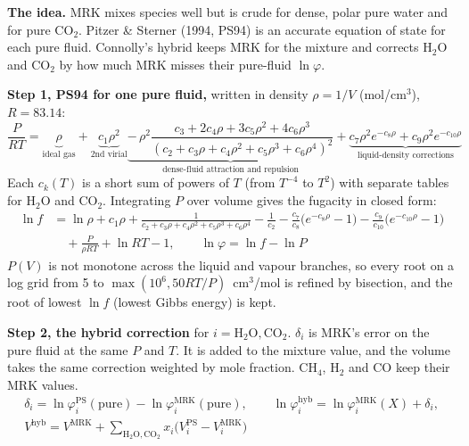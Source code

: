 \documentclass[11pt]{article}
\begin{document}
{\small\setlength{\abovedisplayskip}{2pt}\setlength{\belowdisplayskip}{2pt}
\begin{minipage}[t]{0.60\linewidth}
\textbf{The idea.} MRK mixes species well but is crude for dense, polar pure water and for pure CO$_2$. Pitzer \& Sterner (1994, PS94) is an accurate equation of state for each pure fluid. Connolly's hybrid keeps MRK for the mixture and corrects H$_2$O and CO$_2$ by how much MRK misses their pure-fluid $\ln\varphi$.

\textbf{Step 1, PS94 for one pure fluid,} written in density $\rho=1/V$ (mol/cm$^3$), $R=83.14$:
\begin{equation}
  \frac{ P}{RT}=\underbrace{\rho}_{\text{ideal gas}}+\underbrace{c_1\rho^2}_{\text{2nd virial}}
  \underbrace{-\,\rho^2\frac{c_3+2c_4\rho+3c_5\rho^2+4c_6\rho^3}{(c_2+c_3\rho+c_4\rho^2+c_5\rho^3+c_6\rho^4)^2}}_{\text{dense-fluid attraction and repulsion}}
  +\underbrace{c_7\rho^2e^{-c_8\rho}+c_9\rho^2e^{-c_{10}\rho}}_{\text{liquid-density corrections}}
\end{equation}
Each $c_k(T)$ is a short sum of powers of $T$ (from $T^{-4}$ to $T^{2}$) with separate tables for H$_2$O and CO$_2$. Integrating $P$ over volume gives the fugacity in closed form:
\begin{align}
  \ln f&=\ln\rho+c_1\rho+\frac{1}{c_2+c_3\rho+c_4\rho^2+c_5\rho^3+c_6\rho^4}-\frac{1}{c_2}
  -\frac{c_7}{c_8}\big(e^{-c_8\rho}-1\big)-\frac{c_9}{c_{10}}\big(e^{-c_{10}\rho}-1\big)\nonumber\\
  &\quad+\frac{P}{\rho RT}+\ln RT-1,\qquad \ln\varphi=\ln f-\ln P
\end{align}
$P(V)$ is not monotone across the liquid and vapour branches, so every root on a log grid from 5 to $\max(10^6,50RT/P)$~cm$^3$/mol is refined by bisection, and the root of lowest $\ln f$ (lowest Gibbs energy) is kept.

\textbf{Step 2, the hybrid correction} for $i=\mathrm{H_2O,CO_2}$. $\delta_i$ is MRK's error on the pure fluid at the same $P$ and $T$. It is added to the mixture value, and the volume takes the same correction weighted by mole fraction. CH$_4$, H$_2$ and CO keep their MRK values.
\begin{gather}
  \delta_i=\ln\varphi_i^{\mathrm{PS}}(\text{pure})-\ln\varphi_i^{\mathrm{MRK}}(\text{pure}),\qquad
  \ln\varphi_i^{\mathrm{hyb}}=\ln\varphi_i^{\mathrm{MRK}}(X)+\delta_i,\nonumber\\
  V^{\mathrm{hyb}}=V^{\mathrm{MRK}}+\sum_{\mathrm{H_2O,CO_2}}x_i\big(V_i^{\mathrm{PS}}-V_i^{\mathrm{MRK}}\big)
\end{gather}


\end{minipage}}
\end{document}
